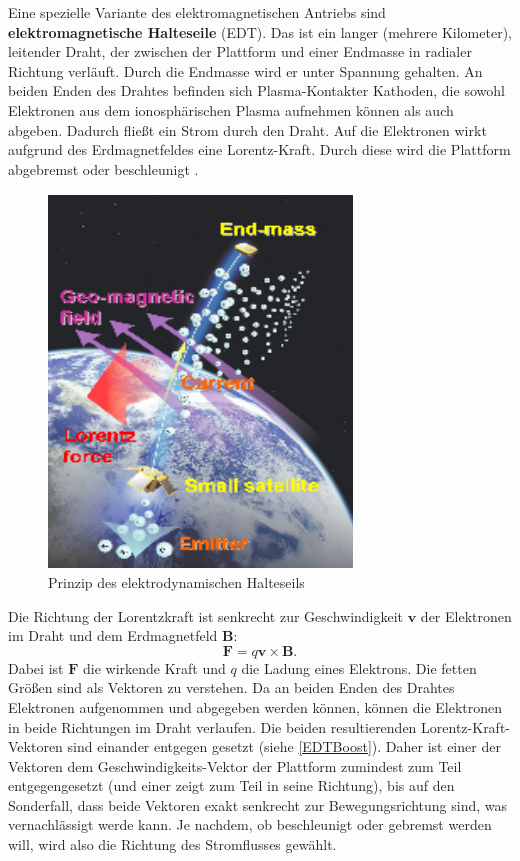 \documentclass{article}
\begin{document}
\noindent Eine spezielle Variante des elektromagnetischen Antriebs sind \textbf{elektromagnetische Halteseile} (EDT). Das ist ein langer (mehrere Kilometer), leitender Draht, der zwischen der Plattform und einer Endmasse in radialer Richtung verläuft. Durch die Endmasse wird er unter Spannung gehalten. An beiden Enden des Drahtes befinden sich Plasma-Kontakter Kathoden, die sowohl Elektronen aus dem ionosphärischen Plasma aufnehmen können als auch abgeben. Dadurch fließt ein Strom durch den Draht. Auf die Elektronen wirkt aufgrund des Erdmagnetfeldes eine Lorentz-Kraft. Durch diese wird die Plattform abgebremst oder beschleunigt \citep{levin2012wholesale}.
\begin{figure}[H]
	\centering
	\includegraphics[width=0.5\linewidth]{bilder/EDT.png}
	\caption{Prinzip des elektrodynamischen Halteseils \citep{kobayashi2009deployment}}
	\label{EDT}
\end{figure}
\noindent Die Richtung der Lorentzkraft ist senkrecht zur Geschwindigkeit $\mathbf{v}$ der Elektronen im Draht und dem Erdmagnetfeld $\mathbf{B}$:
\begin{equation} \mathbf{F} = q \mathbf{v} \times \mathbf{B}. \label{Kraft}\end{equation}
Dabei ist $\mathbf{F}$ die wirkende Kraft und $q$ die Ladung eines Elektrons. Die fetten Größen sind als Vektoren zu verstehen. Da an beiden Enden des Drahtes Elektronen aufgenommen und abgegeben werden können, können die Elektronen in beide Richtungen im Draht verlaufen. Die beiden resultierenden Lorentz-Kraft-Vektoren sind einander entgegen gesetzt (siehe \autoref{EDTBoost}). Daher ist einer der Vektoren dem Geschwindigkeits-Vektor der Plattform zumindest zum Teil entgegengesetzt (und einer zeigt zum Teil in seine Richtung), bis auf den Sonderfall, dass beide Vektoren exakt senkrecht zur Bewegungsrichtung sind, was vernachlässigt werde kann. Je nachdem, ob beschleunigt oder gebremst werden will, wird also die Richtung des Stromflusses gewählt.
\end{document}
